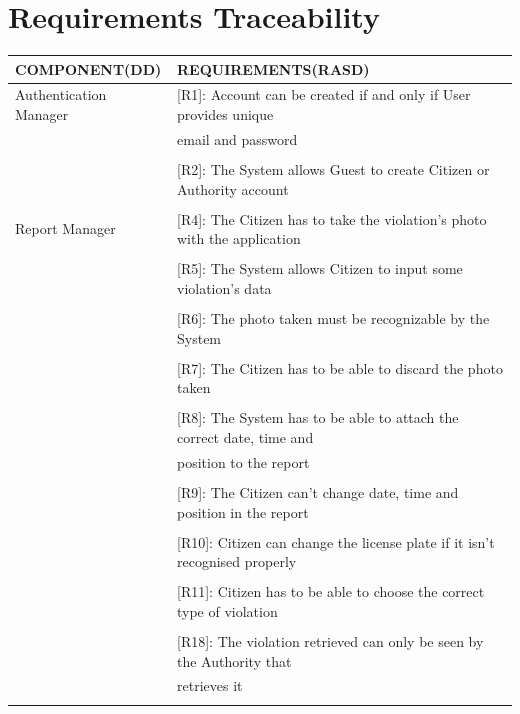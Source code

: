 \documentclass{article}
\begin{document}
\section{Requirements Traceability}
\begin{center}
    \begin{tabular}{ | l | l |}
        \hline
        COMPONENT(DD) & REQUIREMENTS(RASD) \\
        \hline
        Authentication Manager & [R1]: Account can be created if and only if User provides unique \\ 
                               & email and password \\\\
                               & [R2]: The System allows Guest to create Citizen or Authority account \\\\
        \hline
        Report Manager  & [R4]: The Citizen has to take the violation’s photo with the application \\\\
                        & [R5]: The System allows Citizen to input some violation’s data \\\\
                        & [R6]: The photo taken must be recognizable by the System \\\\
                        & [R7]: The Citizen has to be able to discard the photo taken \\\\
                        & [R8]: The System has to be able to attach the correct date, time and \\ 
                        & position to the report \\\\
                        & [R9]: The Citizen can’t change date, time and position in the report \\\\ 
                        & [R10]: Citizen can change the license plate if it isn’t recognised properly \\\\
                        & [R11]: Citizen has to be able to choose the correct type of violation \\\\
                        & [R18]: The violation retrieved can only be seen by the Authority that \\
                        & retrieves it \\\\

\end{tabular}
\end{center}
\end{document}
